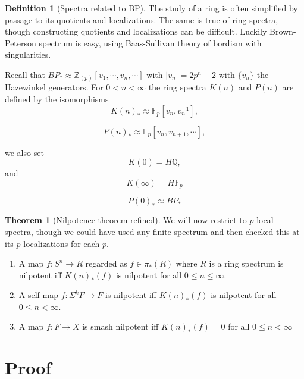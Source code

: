 \documentclass[11pt, oneside]{article}   	%
\theoremstyle{definition}
\newtheorem*{defn}{Definition}
\newtheorem{thm}{Theorem}
\begin{document}
\begin{defn}[Spectra related to BP] The study of a ring is often simplified by passage to its quotients and localizations. The same is true of ring spectra, though constructing quotients and localizations can be difficult. Luckily Brown-Peterson spectrum is easy, using Baas-Sullivan theory of bordism with singularities.

Recall that $BP_*\approx \mathbb{Z}_{(p)}[v_1,\cdots,v_n,\cdots]$ with $|v_n|=2p^{n}-2$ with $\{v_n\}$ the Hazewinkel generators. For $0<n<\infty$ the ring spectra $K(n)$ and $P(n)$ are defined by the isomorphisms
\begin{equation}
	K(n)_*\approx \mathbb{F}_p[v_n,v_n^{-1}],
\end{equation}

\begin{equation}
	P(n)_*\approx \mathbb{F}_p[v_n, v_{n+1},\cdots],
\end{equation}

we also set
\begin{equation}
	K(0)=H \mathbb{Q},
\end{equation}
and
\begin{equation}
	K(\infty)= H \mathbb{F}_p
\end{equation}

\begin{equation}
	P(0)_*\approx BP_*
\end{equation}
\end{defn}

\begin{thm}
	[Nilpotence theorem refined]

	We will now restrict to $p$-local spectra, though we could have used any finite spectrum and then checked this at its $p$-localizations for each $p$.

	\begin{enumerate}[(1)]
		\item A map $f:S^n\to R$ regarded as $f\in \pi_*(R)$ where $R$ is a ring spectrum is nilpotent iff $K(n)_*(f)$ is nilpotent for all $0\leq n\leq \infty$.
		\item A self map $f:\Sigma^kF\to F$ is nilpotent iff $K(n)_*(f)$ is nilpotent for all $0\le n<\infty$.
		\item A map $f:F\to X$ is smash nilpotent iff $K(n)_*(f)=0$ for all $0\le n<\infty$
	\end{enumerate}
\end{thm}

\section{Proof}
\end{document}
